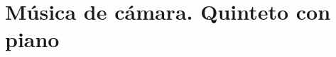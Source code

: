 \section{Música de cámara. Quinteto con piano}

\begin{singlespace}
\end{singlespace}

\newpage
\parindent=0mm
\begin{centering}
\end{centering}
\parindent=6mm

